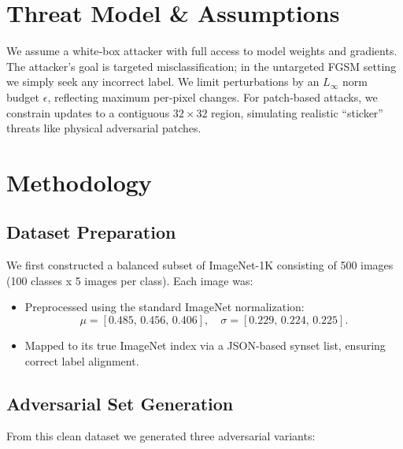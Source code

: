 \documentclass[twoside,11pt]{article}
\begin{document}
\section{Threat Model \& Assumptions}
We assume a white‑box attacker with full access to model weights and gradients. The attacker’s goal is targeted misclassification; in the untargeted FGSM  \citep{goodfellow2015fgsm} setting we simply seek any incorrect label. We limit perturbations by an $L_\infty$ norm budget $\epsilon$, reflecting maximum per‑pixel changes. For patch‑based attacks, we constrain updates to a contiguous $32\times32$ region, simulating realistic “sticker” threats like physical adversarial patches.


\section{Methodology}

\subsection{Dataset Preparation}
We first constructed a balanced subset of ImageNet-1K consisting of 500 images (100 classes x 5 images per class). Each image was:
\begin{itemize}
  \item Preprocessed using the standard ImageNet normalization:
    \[
      \mu = [0.485,\,0.456,\,0.406], \quad
      \sigma = [0.229,\,0.224,\,0.225].
    \]
  \item Mapped to its true ImageNet index via a JSON-based synset list, ensuring correct label alignment.
\end{itemize}

\subsection{Adversarial Set Generation}
From this clean dataset we generated three adversarial variants:
\end{document}
